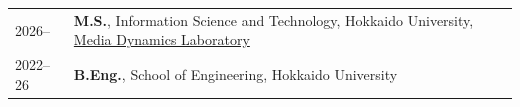
\begin{longtable}[l]{@{}p{} p{}}

    2026-- & \textbf{M.S.}, Information Science and Technology, Hokkaido University, \href{https://www-lmd.ist.hokudai.ac.jp/}{Media Dynamics Laboratory} \\

    2022--26 & \textbf{B.Eng.}, School of Engineering, Hokkaido University

\end{longtable}
